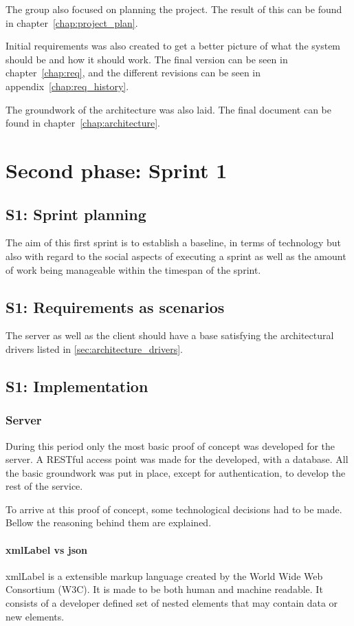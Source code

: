 \documentclass[11pt]{book}
\begin{document}
The group also focused on planning the project. The result of this can be found in chapter~\ref{chap:project_plan}.

Initial requirements was also created to get a better picture of what the system should be and how it should work. The final version can be seen in chapter~\ref{chap:req}, and the different revisions can be seen in appendix~\ref{chap:req_history}.

The groundwork of the architecture was also laid. The final document can be found in chapter~\ref{chap:architecture}.

\section{Second phase: Sprint 1}
\subsection{S1: Sprint planning}
The aim of this first sprint is to establish a baseline, in terms of technology but also with regard to the social aspects of executing a sprint as well as the amount of work being manageable within the timespan of the sprint.

\subsection{S1: Requirements as scenarios}
The server as well as the client should have a base satisfying the architectural drivers listed in \ref{sec:architecture_drivers}.

\subsection{S1: Implementation}

\subsubsection{Server}
During this period only the most basic proof of concept was developed for the server. A RESTful access point was made for the developed, with a database. All the basic groundwork was put in place, except for authentication, to develop the rest of the service.

To arrive at this proof of concept, some technological decisions had to be made. Bellow the reasoning behind them are explained.

\paragraph{\gls{xmlLabel} vs \gls{json}}
\gls{xmlLabel} is a extensible markup language created by the World Wide Web Consortium (W3C). It is made to be both human and machine readable. It consists of a developer defined set of nested elements that may contain data or new elements.
\end{document}
